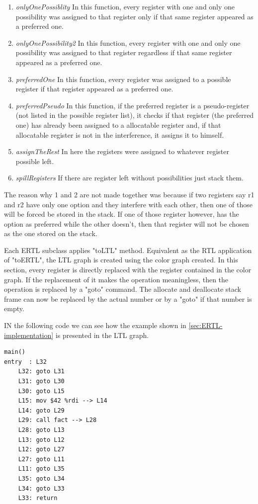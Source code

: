 \documentclass[conference]{IEEEtran}
\theoremstyle{definition}
\begin{document}
\begin{enumerate}
	\item \textit{onlyOnePossiblity} In this function, every register with one and only one possibility was assigned to that register only if that same register appeared as a preferred one.
	\item \textit{onlyOnePossibility2} In this function, every register with one and only one possibility was assigned to that register regardless if that same register appeared as a preferred one.
	\item \textit{preferredOne} In this function, every register was assigned to a possible register if that register appeared as a preferred one.
	\item \textit{preferredPseudo} In this function, if the preferred register is a pseudo-register (not listed in the possible register list), it checks if that register (the preferred one) has already been assigned to a allocatable register and, if that allocatable register is not in the interference, it assigns it to himself.
	\item \textit{assignTheRest} In here the registers were assigned to whatever register possible left.
	\item \textit{spillRegisters} If there are register left without possibilities just stack them.
\end{enumerate}

The reason why 1 and 2 are not made together was because if two registers say r1 and r2 have only one option and they interfere with each other, then one of those will be forced be stored in the stack. If one of those register however, has the option as preferred while the other doesn't, then that register will not be chosen as the one stored on the stack.

Each ERTL subclass applies "toLTL" method. Equivalent as the RTL application of "toERTL", the LTL graph is created using the color graph created. In this section, every register is directly replaced with the register contained in the color graph. If the replacement of it makes the operation meaningless, then the operation is replaced by a "goto" command. The allocate and deallocate stack frame can now be replaced by the actual number or by a "goto" if that number is empty.

IN the following code we can see how the example shown in \ref{sec:ERTL-implementation} is presented in the LTL graph.

\begin{lstlisting}
main()
entry  : L32
	L32: goto L31
	L31: goto L30
	L30: goto L15
	L15: mov $42 %rdi --> L14
	L14: goto L29
	L29: call fact --> L28
	L28: goto L13
	L13: goto L12
	L12: goto L27
	L27: goto L11
	L11: goto L35
	L35: goto L34
	L34: goto L33
	L33: return
\end{lstlisting}
\end{document}
